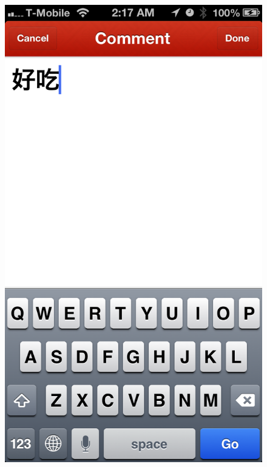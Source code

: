 \begin{figure}
{	\includegraphics[width=\figwidth, totalheight=\figheight, keepaspectratio]{./screenshots/foodlist-comment.png}} \hfill \\
\end{figure}
